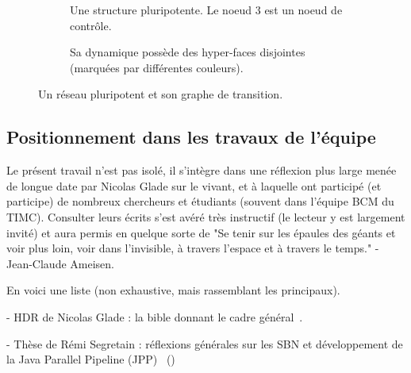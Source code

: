 \documentclass[12pt, a4paper]{article}
\begin{document}
\begin{figure}[H]
    \centering
    \begin{subfigure}{0.48\linewidth}
        \centering
        \caption{Une structure pluripotente. Le noeud 3 est un noeud de contrôle.}
        \label{fig:structure-pluripotente-3d}
    \end{subfigure}
    \hfill
    \begin{subfigure}{0.48\linewidth}
        \centering
        \caption{Sa dynamique possède des hyper-faces disjointes (marquées par différentes couleurs).}
        \label{fig:dynamique-pluripotente-3d}
    \end{subfigure}
    \caption{Un réseau pluripotent et son graphe de transition.}
    \label{fig:reseau-pluripotent-3d}
\end{figure}


\subsection{Positionnement dans les travaux de l'équipe}

Le présent travail n'est pas isolé, il s'intègre dans une réflexion plus large menée de longue date par Nicolas Glade sur le vivant, et à laquelle ont participé (et participe) de nombreux chercheurs et étudiants (souvent dans l'équipe BCM du TIMC). Consulter leurs écrits s'est avéré très instructif (le lecteur y est largement invité) et aura permis en quelque sorte de "Se tenir sur les épaules des géants et voir plus loin, voir dans l'invisible, à travers l'espace et à travers le temps." - Jean-Claude Ameisen. 

En voici une liste (non exhaustive, mais rassemblant les principaux).

- HDR de Nicolas Glade : la bible donnant le cadre général~\cite{glade2022}.

- Thèse de Rémi Segretain : réflexions générales sur les SBN et développement de la Java Parallel Pipeline (JPP)~\cite{segretain2023} ()
\end{document}

